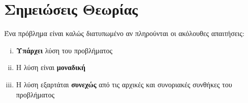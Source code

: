 






\pagestyle{vangelis}
\setcounter{chapter}{1}







\section*{Σημειώσεις Θεωρίας}



\begin{mybox1}
\begin{dfn}
  Ένα πρόβλημα είναι \textcolor{Col1}{καλώς διατυπωμένο} αν πληρούνται οι ακόλουθες 
  απαιτήσεις:
  \begin{enumerate}[i)]
    \item \textbf{Υπάρχει} λύση του προβλήματος
    \item Η λύση είναι \textbf{μοναδική}
    \item Η λύση εξαρτάται \textbf{συνεχώς} από τις αρχικές και συνοριακές συνθήκες του
      προβλήματος
  \end{enumerate}
\end{dfn}
\end{mybox1}






